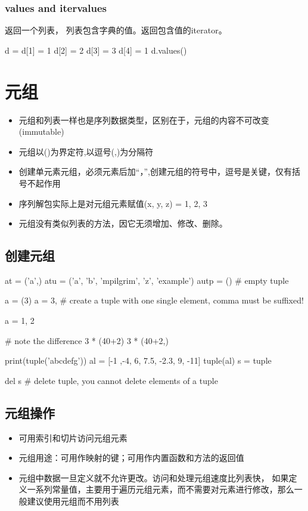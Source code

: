 \subsubsection{values and itervalues}
返回一个列表， 列表包含字典的值。返回包含值的iterator。
\begin{python}
d = {}
d[1] = 1
d[2] = 2
d[3] = 3
d[4] = 1
d.values()
\end{python}
\section{元组}
\begin{itemize}
\item 元组和列表一样也是序列数据类型，区别在于，元组的内容不可改变(immutable)
\item 元组以()为界定符,以逗号(,)为分隔符
\item 创建单元素元组，必须元素后加“，”,创建元组的符号中，逗号是关键，仅有括号不起作用
\item 序列解包实际上是对元组元素赋值(x, y, z) = 1, 2, 3
\item 元组没有类似列表的方法，因它无须增加、修改、删除。
\end{itemize}
\subsection{创建元组}
\begin{python}
at = ('a',)
atu = ('a', 'b', 'mpilgrim', 'z', 'example')
autp = ()  #  empty tuple

a = (3)
a = 3,  # create a tuple with one single element, comma must be suffixed!

a = 1, 2

# note the difference
3 * (40+2)
3 * (40+2,)

print(tuple('abcdefg'))
al = [-1 ,-4, 6, 7.5, -2.3, 9, -11]
tuple(al)
s = tuple

del s  #  delete tuple, you cannot delete elements of a tuple
\end{python}
\subsection{元组操作}
\begin{itemize}
\item 可用索引和切片访问元组元素
\item 元组用途：可用作映射的键；可用作内置函数和方法的返回值
\item 元组中数据一旦定义就不允许更改。访问和处理元组速度比列表快， 如果定义一系列常量值，主要用于遍历元组元素，而不需要对元素进行修改，那么一般建议使用元组而不用列表
\end{itemize}
